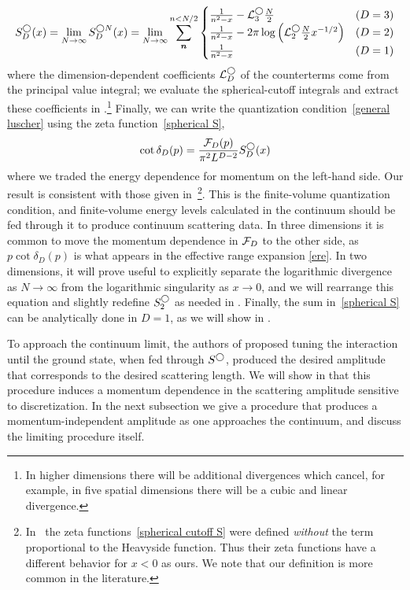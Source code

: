 \begin{equation}\label{eq:spherical S}
    S^\bigcirc_D(x)
    =
    \lim_{N\rightarrow\infty} S^{\bigcirc N}_D(x)
    =
    \lim_{N\rightarrow\infty} \sum_{\boldsymbol{n}}^{n < N/2}
    \begin{cases}
     \frac{1}{n^2-x} - \mathcal{L}_3^\bigcirc \frac{N}{2}& (D=3)\\
     \frac{1}{n^2-x} - 2\pi\log\left(\mathcal{L}_2^\bigcirc\frac{N}{2}x^{-1/2}\right)& (D=2)\\
    \frac{1}{n^2-x} & (D=1)
     \end{cases}
\end{equation}
where the dimension-dependent coefficients $\mathcal{L}_D^\bigcirc$ of the counterterms come from the principal value integral; we evaluate the spherical-cutoff integrals and extract these coefficients in .\footnote{In higher dimensions there will be additional divergences which cancel, for example, in five spatial dimensions there will be a cubic and linear divergence.
}
Finally, we can write the quantization condition~\eqref{general luscher} using the zeta function~\eqref{spherical S},
\begin{equation}\label{eq:spherical quantization}
    \cot \delta_{D}(p) = \frac{\mathcal{F}_{D}(p)}{\pi^2 L^{D-2}} S^\bigcirc_D(x)
\end{equation}
where we traded the energy dependence for momentum on the left-hand side.  Our result is consistent with those given in~\footnote{In~ the zeta functions~\eqref{spherical cutoff S} were defined \emph{without} the term proportional to the Heavyside function.  Thus their zeta functions have a different behavior for $x<0$ as ours.  We note that our definition is more common in the literature.}.
This is the \Luscher finite-volume quantization condition, and finite-volume energy levels calculated in the continuum should be fed through it to produce continuum scattering data.
In three dimensions it is common to move the momentum dependence in $\mathcal{F}_{D}$ to the other side, as $p \cot\delta_{D}(p)$ is what appears in the effective range expansion \eqref{ere}.
In two dimensions, it will prove useful to explicitly separate the logarithmic divergence as $N\to\infty$ from the logarithmic singularity as $x\to 0$, and we will rearrange this equation and slightly redefine $S^\bigcirc_2$ as needed in .  Finally, the sum in~\eqref{spherical S} can be analytically done in $D=1$, as we will show in .


To approach the continuum limit, the authors of  proposed tuning the interaction until the ground state, when fed through $S^\bigcirc$, produced the desired amplitude that corresponds to the desired scattering length.
We will show in  that this procedure induces a momentum dependence in the scattering amplitude sensitive to discretization.
In the next subsection we give a procedure that produces a momentum-independent amplitude as one approaches the continuum, and discuss the limiting procedure itself.
